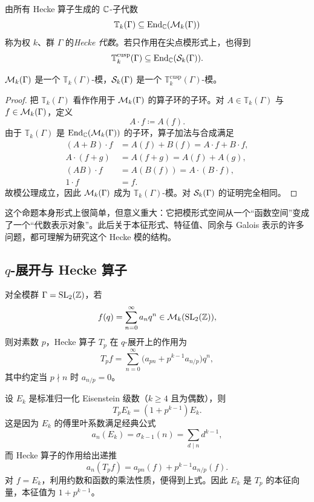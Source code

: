 \begin{definition}
由所有 Hecke 算子生成的 $\mathbb{C}$-子代数
\[
\mathbb T_k(\Gamma)\subseteq \mathrm{End}_{\mathbb{C}}(\mathcal{M}_k(\Gamma))
\]
称为权 $k$、群 $\Gamma$ 的\emph{Hecke 代数}。若只作用在尖点模形式上，也得到
\[
\mathbb T_k^{\mathrm{cusp}}(\Gamma)\subseteq \mathrm{End}_{\mathbb{C}}(\mathcal{S}_k(\Gamma)).
\]
\end{definition}

\begin{proposition}
$\mathcal{M}_k(\Gamma)$ 是一个 $\mathbb T_k(\Gamma)$-模，$\mathcal{S}_k(\Gamma)$ 是一个 $\mathbb T_k^{\mathrm{cusp}}(\Gamma)$-模。
\end{proposition}

\begin{proof}
把 $\mathbb T_k(\Gamma)$ 看作作用于 $\mathcal{M}_k(\Gamma)$ 的算子环的子环。对 $A\in \mathbb T_k(\Gamma)$ 与 $f\in \mathcal{M}_k(\Gamma)$，定义
\[
A\cdot f\coloneqq A(f).
\]
由于 $\mathbb T_k(\Gamma)$ 是 $\mathrm{End}_{\mathbb{C}}(\mathcal{M}_k(\Gamma))$ 的子环，算子加法与合成满足
\begin{align*}
(A+B)\cdot f&=A(f)+B(f)=A\cdot f+B\cdot f,\\
A\cdot (f+g)&=A(f+g)=A(f)+A(g),\\
(AB)\cdot f&=A(B(f))=A\cdot (B\cdot f),\\
1\cdot f&=f.
\end{align*}
故模公理成立，因此 $\mathcal{M}_k(\Gamma)$ 成为 $\mathbb T_k(\Gamma)$-模。对 $\mathcal{S}_k(\Gamma)$ 的证明完全相同。
\end{proof}

\begin{remark}
这个命题本身形式上很简单，但意义重大：它把模形式空间从一个“函数空间”变成了一个“代数表示对象”。此后关于本征形式、特征值、同余与 Galois 表示的许多问题，都可理解为研究这个 Hecke 模的结构。
\end{remark}

\subsection{$q$-展开与 Hecke 算子}

对全模群 $\Gamma=\mathrm{SL}_2(\mathbb{Z})$，若
\[
f(q)=\sum_{n=0}^\infty a_n q^n\in \mathcal{M}_k(\mathrm{SL}_2(\mathbb{Z})),
\]
则对素数 $p$，Hecke 算子 $T_p$ 在 $q$-展开上的作用为
\[
T_p f=\sum_{n=0}^\infty \bigl(a_{pn}+p^{k-1}a_{n/p}\bigr)q^n,
\]
其中约定当 $p\nmid n$ 时 $a_{n/p}=0$。

\begin{example}
设 $E_k$ 是标准归一化 Eisenstein 级数（$k\ge 4$ 且为偶数），则
\[
T_pE_k=(1+p^{k-1})E_k.
\]
这是因为 $E_k$ 的傅里叶系数满足经典公式
\[
a_n(E_k)=\sigma_{k-1}(n)=\sum_{d\mid n} d^{k-1},
\]
而 Hecke 算子的作用给出递推
\[
a_n(T_pf)=a_{pn}(f)+p^{k-1}a_{n/p}(f).
\]
对 $f=E_k$，利用约数和函数的乘法性质，便得到上式。因此 $E_k$ 是 $T_p$ 的本征向量，本征值为 $1+p^{k-1}$。
\end{example}

